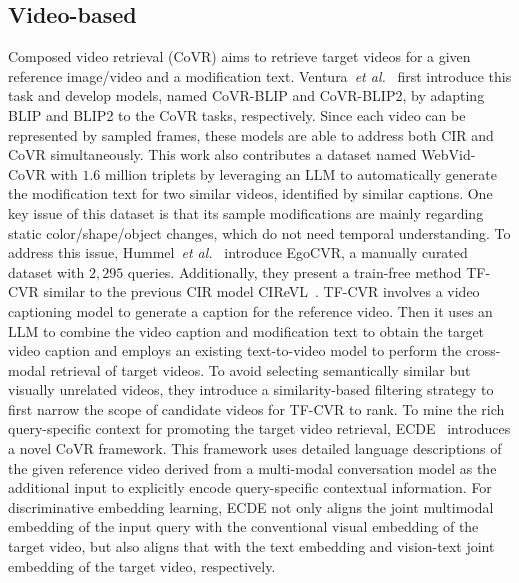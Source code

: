 \subsection{Video-based} 
Composed video retrieval (CoVR) aims to retrieve target videos for a given reference image/video and a modification text. Ventura~\textit{et al.}~\cite{Covr,CoVR2} first introduce this task and develop models, named CoVR-BLIP and CoVR-BLIP2, by adapting BLIP and BLIP2 to the CoVR tasks, respectively. Since each video can be represented by sampled frames, these models are able to address both CIR and CoVR simultaneously. This work also contributes a dataset named WebVid-CoVR with $1.6$ million triplets by leveraging an LLM to automatically generate the modification text for two similar videos, identified by similar captions.
One key issue of this dataset is that its sample modifications are mainly regarding static color/shape/object changes, which do not need temporal understanding. To address this issue, Hummel~\textit{et al.}~\cite{tfrcvr} introduce EgoCVR, a manually curated dataset with $2,295$ queries. Additionally, they present a train-free method TF-CVR similar to the previous CIR model CIReVL~\cite{cirevl}. TF-CVR involves a video captioning model to generate a caption for the reference video. Then it uses an LLM to combine the video caption and modification text to obtain the target video caption and employs an existing text-to-video model to perform the cross-modal retrieval of target videos. To avoid selecting semantically similar but visually unrelated videos, they introduce a similarity-based filtering strategy to first narrow the scope of candidate videos for TF-CVR to rank.
To mine the rich query-specific context for promoting the target video retrieval, ECDE~\cite{ecde} introduces a novel CoVR framework. This framework uses detailed language descriptions of the given reference video derived from a multi-modal conversation model as the additional input to explicitly encode query-specific contextual information. For discriminative embedding learning, ECDE not only aligns the joint multimodal embedding of the input query with the conventional visual embedding of the target video, but also aligns that with the text embedding and vision-text joint embedding of the target video, respectively. 